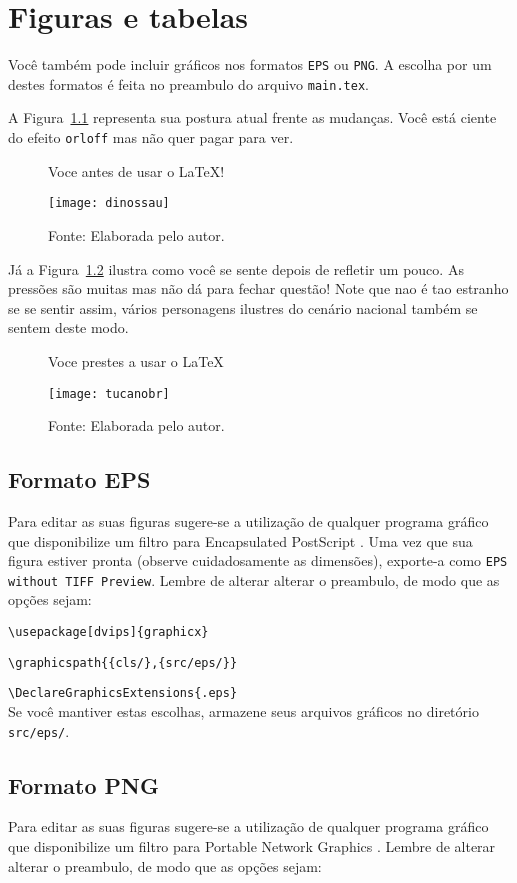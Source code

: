 
\chapter{Figuras e tabelas}

Você também pode incluir gráficos nos formatos \texttt{EPS} ou \texttt{PNG}. A escolha por um destes formatos é feita no preambulo do arquivo \texttt{main.tex}. 

A Figura~\ref{dinosaur} representa sua postura atual frente as mudanças.
Você está ciente do efeito \texttt{orloff} mas não quer pagar para
ver. \begin{figure}[htbp]
\caption{Voce antes de usar o LaTeX!}%
\centering \texttt{[image: dinossau]}
\caption*{Fonte: Elaborada pelo autor.}
 \label{dinosaur}%
\end{figure}

Já a Figura~\ref{toucan} ilustra como você se sente depois de refletir
um pouco. As pressões são muitas mas não dá para fechar
questão! Note que nao é tao estranho se se sentir assim, vários
personagens ilustres do cenário nacional também se sentem deste modo.
\begin{figure}[htbp]
\caption{Voce prestes a usar o LaTeX}
\centering \texttt{[image: tucanobr]} \label{toucan}%
\caption*{Fonte: Elaborada pelo autor.}
\end{figure}

\section{Formato EPS}

Para editar as suas figuras sugere-se a utilização de qualquer
programa gráfico que disponibilize um filtro para Encapsulated PostScript
\cite{Doron92e}. Uma vez que sua figura estiver pronta (observe cuidadosamente as dimensões), exporte-a como \texttt{EPS without TIFF Preview}. Lembre de alterar alterar o preambulo, de modo que as opções sejam:

\noindent\verb|\usepackage[dvips]{graphicx}|

\noindent\verb|\graphicspath{{cls/},{src/eps/}}|

\noindent\verb|\DeclareGraphicsExtensions{.eps}|\\
Se você mantiver estas escolhas, armazene seus arquivos gráficos no diretório \texttt{src/eps/}.

\section{Formato PNG}
Para editar as suas figuras sugere-se a utilização de qualquer
programa gráfico que disponibilize um filtro para Portable Network Graphics
\cite{Christensson}. Lembre de alterar alterar o preambulo, de modo que as opções sejam:

